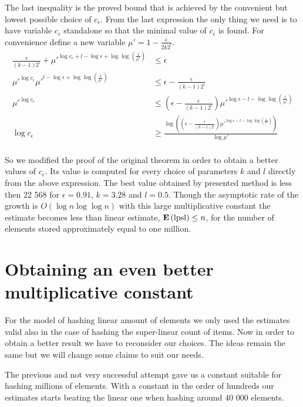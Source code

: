 The last inequality is the proved bound that is achieved by the convenient but lowest possible choice of $c_\epsilon$. From the last expression the only thing we need is to have variable $c_\epsilon$ standalone so that the minimal value of $c_\epsilon$ is found. For convenience define a new variable $\mu' = 1 - \frac{\epsilon}{2 k 2 ^l}$.
\[
\begin{split}
\frac{\epsilon}{(k - 1) 2 ^ l} + {\mu'}^{\log c_\epsilon + l - \log \epsilon + \log \log \left(\frac{1}{\mu'}\right)} & \leq \epsilon \\
{\mu'}^{\log c_\epsilon}{\mu'}^{l - \log \epsilon + \log \log \left(\frac{1}{\mu'}\right)} & \leq \epsilon - \frac{\epsilon}{(k - 1) 2 ^ l} \\
{\mu'}^{\log c_\epsilon} & \leq \left(\epsilon - \frac{\epsilon}{(k - 1) 2 ^ l}\right) {\mu'}^{\log \epsilon - l - \log \log \left(\frac{1}{\mu'}\right)} \\
{\log c_\epsilon} & \geq \frac{\log \left( \left( \epsilon - \frac{\epsilon}{(k - 1) 2 ^ l}\right) {\mu'}^{\log \epsilon - l - \log \log \left(\frac{1}{\mu'}\right)}\right)}{\log \mu'}  \\
\end{split}
\]

So we modified the proof of the original theorem in order to obtain a better values of $c_\epsilon$. Its value is computed for every choice of parameters $k$ and $l$ directly from the above expression. The best value obtained by presented method is less then 22 568 for $\epsilon = 0.91$, $k = 3.28$ and $l = 0.5$. Though the asymptotic rate of the growth is $O(\log n \log \log n)$ with this large multiplicative constant the estimate becomes less than linear estimate, $\mathbf{E}\left(\mathrm{lpsl}\right) \leq n$, for the number of elements stored approximately equal to one million.

\section{Obtaining an even better multiplicative constant}
For the model of hashing linear amount of elements we only used the estimates valid also in the case of hashing the super-linear count of items. Now in order to obtain a better result we have to reconsider our choices. The ideas remain the same but we will change some claims to suit our needs.

The previous and not very successful attempt gave us a constant suitable for hashing millions of elements. With a constant in the order of hundreds our estimates starts beating the linear one when hashing around 40 000 elements.

